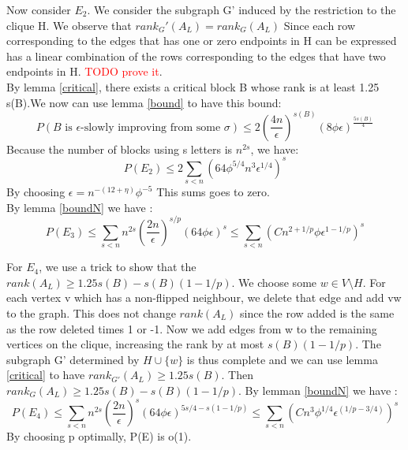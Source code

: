 \documentclass[12pt]{article}
\begin{document}
Now consider $E_2$. We consider the subgraph G' induced by the restriction to the clique H. We observe that $rank_G'(A_L) = rank_G(A_L)$ Since each row corresponding to the edges that has one or zero endpoints in H can be expressed has a linear combination of the rows corresponding to the edges that have two endpoints in H. \textcolor{red}{TODO prove it}. \\
By lemma \ref{critical}, there exists a critical block B whose rank is at least 1.25 s(B).We now can use lemma \ref{bound} to have this bound:
\begin{equation*}
P(B \text{ is }\epsilon \text {-slowly improving from some }\sigma) \leq 2(\frac{4n}{\epsilon})^{s(B)}(8\phi\epsilon)^{\frac{5s(B)}{4}}
\end{equation*}
Because the number of blocks using s letters is $n^{2s}$, we have:
\begin{equation*}
P(E_2) \leq 2 \sum_{s < n}(64\phi^{5/4}n^3\epsilon^{1/4})^s
\end{equation*}
By choosing $\epsilon = n^{-(12 + \eta)}\phi^{-5}$ This sums goes to zero.\\

By lemma \ref{boundN} we have :
\begin{equation*}
P(E_3) \leq  \sum_{s < n}n^{2s}(\dfrac{2n}{\epsilon})^{s/p}(64\phi\epsilon)^{s} \leq \sum_{s < n}(Cn^{2 + 1/p}\phi\epsilon^{1 - 1/p})^{s}
\end{equation*}

For $E_4$, we use a trick to show that the $rank(A_L) \geq 1.25s(B) - s(B)(1 - 1/p)$. We choose some $w \in V \setminus H$. For each vertex v which has a non-flipped neighbour, we delete that edge and add vw to the graph. This does not change $rank(A_L)$ since the row added is the same as the row deleted times 1 or -1. Now we add edges from w to the remaining vertices on the clique, increasing the rank by at most $s(B)(1 - 1/p)$. The subgraph G' determined by $H \cup \{w\}$ is thus complete and we can use  lemma \ref{critical} to have $rank_{G'}(A_L) \geq 1.25 s(B)$. Then $rank_G(A_L) \geq 1.25s(B) - s(B)(1 - 1/p)$.
By lemman \ref{boundN} we have :
\begin{equation*}
P(E_4) \leq  \sum_{s < n}n^{2s}(\dfrac{2n}{\epsilon})^{s}(64\phi\epsilon)^{5s/4 - s(1 - 1/p)} \leq \sum_{s < n}(Cn^{3}\phi^{1/4}\epsilon^{(1/p - 3/4)})^{s}
\end{equation*}
By choosing p optimally, P(E) is o(1). 
\end{document}
